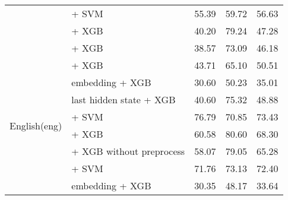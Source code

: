 \begin{longtable}{llccc}
                                          & \citep{sturua2024jinaembeddingsv3multilingualembeddingstask} + SVM     & 55.39                                & 59.72              & 56.63             \\
                                          & \citep{ni2021sentencet5scalablesentenceencoders} + XGB                 & 40.20                                & 79.24              & 47.28             \\
                                          & \citep{wang2023improving} + XGB                                        & 38.57                                & 73.09              & 46.18             \\
    \midrule
    \multirow{16}{*}{English(eng)}        & \citep{all-MiniLM-L12-v2}  + XGB                                       & 43.71                                & 65.10              & 50.51             \\
                                          & \citep{DBLP:journals/corr/abs-1810-04805} embedding + XGB              & 30.60                                & 50.23              & 35.01             \\
                                          & \citep{DBLP:journals/corr/abs-1810-04805} last hidden state + XGB      & 40.60                                & 75.32              & 48.88             \\
                                          & \citep{wang2024multilingual} + SVM                                     & 76.79                                & 70.85              & 73.43             \\
                                          & \citep{zhang2025jasperstelladistillationsota} + XGB                    & 60.58                                & 80.60              & 68.30             \\
                                          & \citep{zhang2025jasperstelladistillationsota} + XGB without preprocess & 58.07                                & 79.05              & 65.28             \\
                                          & \citep{zhang2025jasperstelladistillationsota} + SVM                    & 71.76                                & 73.13              & 72.40             \\
                                          & \citep{DBLP:journals/corr/abs-1907-11692} embedding + XGB              & 30.35                                & 48.17              & 33.64             \\

\end{longtable}
